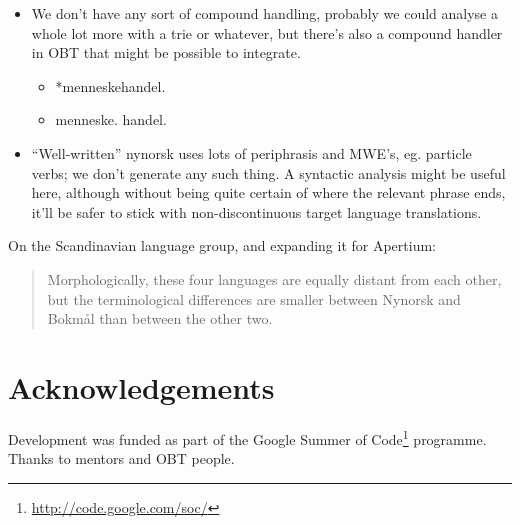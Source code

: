 \documentclass[11pt]{article}
\begin{document}
\begin{itemize}
\item We don't have any sort of compound handling, probably we could
  analyse a whole lot more with a trie or whatever, but there's also a
  compound handler in OBT that might be possible to integrate.

\begin{itemize}
\item *menneskehandel.
\item menneske. handel.
\end{itemize}

\item ``Well-written'' nynorsk uses lots of periphrasis and MWE's, eg. particle
  verbs; we don't generate any such thing. A syntactic analysis might
  be useful here, although without being quite certain of where the
  relevant phrase ends, it'll be safer to stick with non-discontinuous
  target language translations.
\end{itemize}
On the Scandinavian language group, and expanding it for Apertium:
\begin{quote}
Morphologically, these four languages are equally distant from each
other, but the terminological differences are smaller between Nynorsk
and Bokmål than between the other two. \\
\citep{everson2000sln}
\end{quote}


\section{Acknowledgements}
\label{sec-6}

Development was funded as part of the Google Summer of Code\footnote{\href{http://code.google.com/soc/}{http://code.google.com/soc/} }
programme. Thanks to mentors and OBT people.



\end{document}
